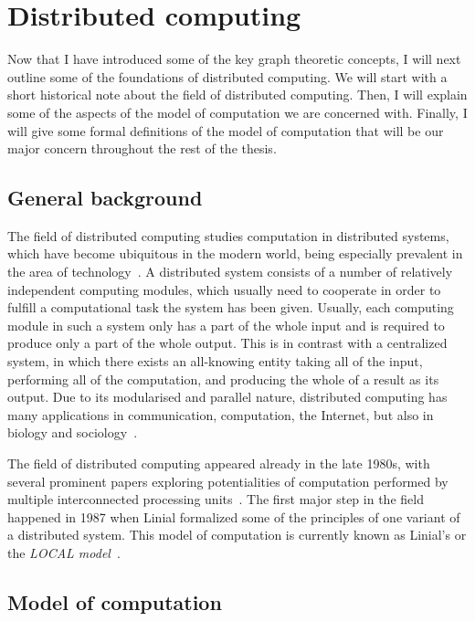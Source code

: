 \section{Distributed computing}

Now that I have introduced some of the key graph theoretic concepts, I will
next outline some of the foundations of distributed computing. We will start with
a short historical note about the field of distributed computing. Then, I will
explain some of the aspects of the model of computation we are concerned with. Finally, 
I will give some formal definitions of the model of computation that will be our
major concern throughout the rest of the thesis.

\subsection{General background}

The field of distributed computing studies computation in distributed systems, which
have become ubiquitous in the modern world, being especially prevalent
in the area of technology~\cite{Attiya2004}.
A distributed system consists of a number of relatively independent
computing modules, which usually need to cooperate in order to
fulfill a computational task the system has been given. Usually,
each computing module in such a system only has a part of the whole
input and is required to produce only a part of the whole output.
This is in contrast with a centralized system, in which there 
exists an all-knowing entity taking all of the input, performing all
of the computation, and producing the whole of a result as its output.
Due to its modularised and parallel nature, distributed computing
has many applications in communication, computation, the Internet,
but also in biology and sociology~\cite{Wattenhofer2016}.

The field of distributed computing appeared already in the late 1980s, with several
prominent papers exploring potentialities of computation performed
by multiple interconnected processing units~\cite{Cole1986, Linial1987, Naor1991}.
The first major step in the field happened in 1987 when Linial formalized
some of the principles of one variant of a distributed system.
This model of computation is currently known as Linial's or the \emph{LOCAL model}~\cite{Linial1987}.

\subsection{Model of computation}

